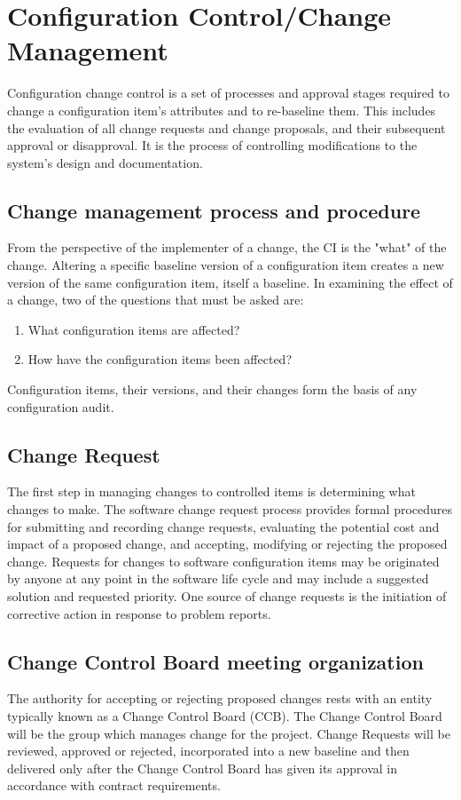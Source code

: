 \documentclass{template/openetcs_article}
\begin{document}
\section{Configuration Control/Change Management}
Configuration change control is a set of processes and approval stages required to change a configuration item's attributes  and to re-baseline them. This includes the evaluation of all change requests and change proposals, and their subsequent  approval or disapproval. It is the process of controlling modifications to the system's design and documentation.

\subsection{Change management process and procedure}
From the perspective of the implementer of a change, the CI is the "what" of the change. Altering a specific baseline version  of a configuration item creates a new version of the same configuration item, itself a baseline. In examining the effect of a  change, two of the questions that must be asked are: 

\vspace{-10pt}
\begin{enumerate}
\item What configuration items are affected?
\item How have the configuration items been affected?
\end{enumerate}

Configuration items, their versions, and their changes form the basis of any configuration audit.

\subsection{Change Request}
The first step in managing changes to controlled items is determining what changes to make. The software change request  process provides formal procedures for submitting and recording change requests, evaluating the potential cost and impact of  a proposed change, and accepting, modifying or rejecting the proposed change. Requests for changes to software  configuration items may be originated by anyone at any point in the software life cycle and may include a suggested solution  and requested priority. One source of change requests is the initiation of corrective action in response to problem reports.

\subsection{Change Control Board meeting organization}
The authority for accepting or rejecting proposed changes rests with an entity typically known as a Change Control Board  (CCB). The Change Control Board will be the group which manages change for the project. Change Requests will be reviewed,  approved or rejected, incorporated into a new baseline and then delivered only after the Change Control Board has given its  approval in accordance with contract requirements.
\end{document}
